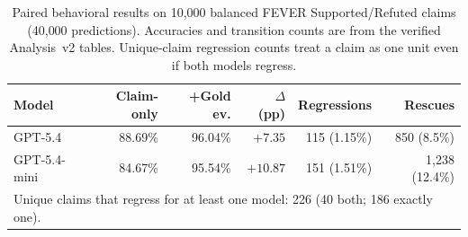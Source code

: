 \begin{table}[t]
\centering
\caption{Paired behavioral results on 10{,}000 balanced FEVER Supported/Refuted claims (40{,}000 predictions). Accuracies and transition counts are from the verified Analysis~v2 tables. Unique-claim regression counts treat a claim as one unit even if both models regress.}
\label{tab:accuracy}
\begin{tabular}{lrrrrr}
\toprule
Model & Claim-only & +Gold ev. & $\Delta$ (pp) & Regressions & Rescues \\
\midrule
GPT-5.4 & 88.69\% & 96.04\% & $+7.35$ & 115 (1.15\%) & 850 (8.5\%) \\
GPT-5.4-mini & 84.67\% & 95.54\% & $+10.87$ & 151 (1.51\%) & 1{,}238 (12.4\%) \\
\midrule
\multicolumn{6}{l}{Unique claims that regress for at least one model: 226 (40 both; 186 exactly one).} \\
\bottomrule
\end{tabular}
\end{table}
